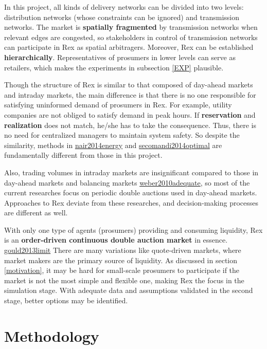 \documentclass[letterpaper,8pt,twocolumn,twoside,]{pinp}
\begin{document}
In this project, all kinds of delivery networks can be divided into two
levels: distribution networks (whose constraints can be ignored) and
transmission networks. The market is \textbf{spatially fragmented} by
transmission networks when relevant edges are congested, so stakeholders
in control of transmission networks can participate in Rex as spatial
arbitragers. Moreover, Rex can be established \textbf{hierarchically}.
Representatives of prosumers in lower levels can serve as retailers,
which makes the experiments in subsection \ref{EXP} plausible.

Though the structure of Rex is similar to that composed of day-ahead
markets and intraday markets, the main difference is that there is no
one responsible for satisfying uninformed demand of prosumers in Rex.
For example, utility companies are not obliged to satisfy demand in peak
hours. If \textbf{reservation} and \textbf{realization} does not match,
he/she has to take the consequence. Thus, there is no need for
centralized managers to maintain system safety. So despite the
similarity, methods in \protect\hyperlink{reference}{nair2014energy} and
\protect\hyperlink{reference}{secomandi2014optimal} are fundamentally
different from those in this project.

Also, trading volumes in intraday markets are insignificant compared to
those in day-ahead markets and balancing markets
\protect\hyperlink{reference}{weber2010adequate}, so most of the current
researches focus on periodic double auctions used in day-ahead markets.
Approaches to Rex deviate from these researches, and decision-making
processes are different as well.

With only one type of agents (prosumers) providing and consuming
liquidity, Rex is an \textbf{order-driven continuous double auction
market} in essence. \protect\hyperlink{reference}{gould2013limit} There
are many variations like quote-driven markets, where market makers are
the primary source of liquidity. As discussed in section
\ref{motivation}, it may be hard for small-scale prosumers to
participate if the market is not the most simple and flexible one,
making Rex the focus in the simulation stage. With adequate data and
assumptions validated in the second stage, better options may be
identified.

\hypertarget{methodology}{%
\section{Methodology}\label{methodology}}
\end{document}
